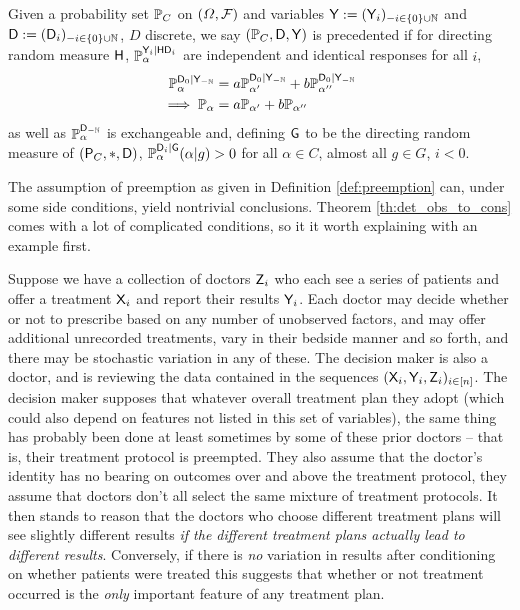 \begin{definition}[Precedent]\label{def:preemption}
Given a probability set $\mathbb{P}_C$ on $(\Omega,\mathcal{F})$ and variables $\mathsf{Y}:=(\mathsf{Y}_i)_{-i\in \{0\}\cup\mathbb{N}}$ and $\mathsf{D}:=(\mathsf{D}_i)_{-i\in \{0\}\cup\mathbb{N}}$, $D$ discrete, we say $(\mathbb{P}_C,\mathsf{D},\mathsf{Y})$ is precedented if for directing random measure $\mathsf{H}$, $\mathbb{P}_\alpha^{\mathsf{Y}_i|\mathsf{HD}_i}$ are independent and identical responses for all $i$, 
\begin{align}
    \mathbb{P}_\alpha^{\mathsf{D}_0|\mathsf{Y}_{-\mathbb{N}}} &= a\mathbb{P}_{\alpha'}^{\mathsf{D}_0|\mathsf{Y}_{-\mathbb{N}}}+b\mathbb{P}_{\alpha''}^{\mathsf{D}_0|\mathsf{Y}_{-\mathbb{N}}}\\
    \implies \mathbb{P}_\alpha &= a\mathbb{P}_{\alpha'}+b\mathbb{P}_{\alpha''}
\end{align}
as well as $\mathbb{P}_\alpha^{\mathsf{D}_{-\mathbb{N}}}$ is exchangeable and, defining $\mathsf{G}$ to be the directing random measure of $(\mathsf{P}_C,*,\mathsf{D})$, $\mathbb{P}_\alpha^{\mathsf{D}_i|\mathsf{G}}(\alpha|g)>0$ for all $\alpha\in C$, almost all $g\in G$, $i<0$.
\end{definition}

The assumption of preemption as given in Definition \ref{def:preemption} can, under some side conditions, yield nontrivial conclusions. Theorem \ref{th:det_obs_to_cons} comes with a lot of complicated conditions, so it it worth explaining with an example first.

Suppose we have a collection of doctors $\mathsf{Z}_i$ who each see a series of patients and offer a treatment $\mathsf{X}_i$ and report their results $\mathsf{Y}_i$. Each doctor may decide whether or not to prescribe based on any number of unobserved factors, and may offer additional unrecorded treatments, vary in their bedside manner and so forth, and there may be stochastic variation in any of these. The decision maker is also a doctor, and is reviewing the data contained in the sequences $(\mathsf{X}_i,\mathsf{Y}_i,\mathsf{Z}_i)_{i\in [n]}$. The decision maker supposes that whatever overall treatment plan they adopt (which could also depend on features not listed in this set of variables), the same thing has probably been done at least sometimes by some of these prior doctors -- that is, their treatment protocol is preempted. They also assume that the doctor's identity has no bearing on outcomes over and above the treatment protocol, they assume that doctors don't all select the same mixture of treatment protocols. It then stands to reason that the doctors who choose different treatment plans will see slightly different results \emph{if the different treatment plans actually lead to different results}. Conversely, if there is \emph{no} variation in results after conditioning on whether patients were treated this suggests that whether or not treatment occurred is the \emph{only} important feature of any treatment plan.

